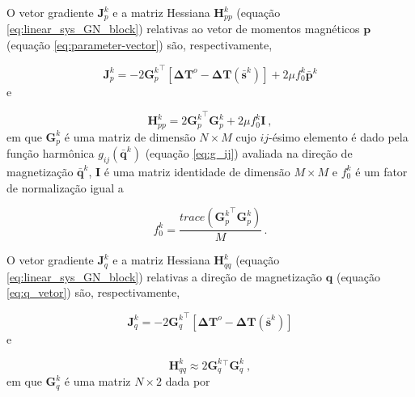 O vetor gradiente $\mathbf{J}_{p}^{k}$ e a matriz Hessiana $\mathbf{H}_{pp}^{k}$ (equação \ref{eq:linear_sys_GN_block}) relativas ao vetor de momentos magnéticos $\mathbf{p}$ (equação \ref{eq:parameter-vector}) são, respectivamente, 

\begin{equation}
\mathbf{J}_{p}^{k} = -2 {\mathbf{G}_{p}^{k}}^{\top} 
\left[ \mathbf{\Delta T}^{o} - \mathbf{\Delta T} (\bar{\mathbf{s}}^{k}) \right] + 
2\mu f_{0}^{k} \bar{\mathbf{p}}^{k} 
\label{eq:grad_p}
\end{equation}
e 

\begin{equation}
\mathbf{H}_{pp}^{k} = 2 {\mathbf{G}_{p}^{k}}^{\top} \mathbf{G}_{p}^{k} + 
2 \mu f_{0}^{k} \mathbf{I} \: ,
\label{eq:hess_p}
\end{equation}
em que $\mathbf{G}_p^{k}$ é uma matriz de dimensão $N \times M$ cujo $ij$-ésimo elemento é dado pela função harmônica $g_{ij}(\bar{\mathbf{q}}^{k})$ (equação \ref{eq:g_ij}) avaliada na direção de magnetização $\bar{\mathbf{q}}^{k}$, $\mathbf{I}$ é uma matriz identidade de dimensão $M \times M$ e $f_{0}^{k}$ é um fator de normalização igual a 

\begin{equation}
f_{0}^{k} = \dfrac{trace \left({\mathbf{G}_{p}^{k}}^{\top} \mathbf{G}_{p}^{k} \right)}{M} \, .
\label{eq:norm_factor}
\end{equation}

O vetor gradiente $\mathbf{J}_{q}^{k}$ e a matriz Hessiana $\mathbf{H}_{qq}^{k}$ (equação \ref{eq:linear_sys_GN_block}) relativas a direção de magnetização $\mathbf{q}$ (equação \ref{eq:q_vetor}) são, respectivamente, 

\begin{equation}
\mathbf{J}_{q}^{k} = -2 {\mathbf{G}_{q}^{k}}^{\top} 
\left[ \mathbf{\Delta T}^{o} - \mathbf{\Delta T} (\bar{\mathbf{s}}^{k}) \right]
\label{eq:grad_q}
\end{equation}
e

\begin{equation}
\mathbf{H}_{qq}^{k} \approx 2 {\mathbf{G}_{q}^{k}}{^\top} \mathbf{G}_{q}^{k} \: ,
\label{eq:hess_q}
\end{equation}
em que $\mathbf{G}_{q}^{k}$ é uma matriz $N \times 2$ dada por 

